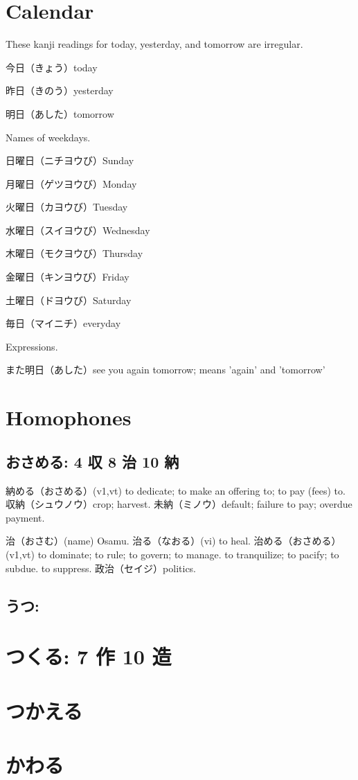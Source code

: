 \section{Calendar}

These kanji readings for today, yesterday, and tomorrow are irregular.

今日（きょう）today

昨日（きのう）yesterday

明日（あした）tomorrow

Names of weekdays.

日曜日（ニチヨウび）Sunday

月曜日（ゲツヨウび）Monday

火曜日（カヨウび）Tuesday

水曜日（スイヨウび）Wednesday

木曜日（モクヨウび）Thursday

金曜日（キンヨウび）Friday

土曜日（ドヨウび）Saturday

毎日（マイニチ）everyday

Expressions.

また明日（あした）see you again tomorrow; means 'again' and 'tomorrow'

\section{Homophones}

\subsection{おさめる: 4 収 8 治 10 納}

納める（おさめる）(v1,vt)
to dedicate; to make an offering to; to pay (fees) to.
収納（シュウノウ）crop; harvest.
未納（ミノウ）default; failure to pay; overdue payment.

治（おさむ）(name) Osamu.
治る（なおる）(vi) to heal.
治める（おさめる）(v1,vt)
to dominate; to rule; to govern; to manage.
to tranquilize; to pacify; to subdue.
to suppress.
政治（セイジ）politics.

\subsection{うつ:}

\section{つくる: 7 作 10 造}

\section{つかえる}

\section{かわる}
